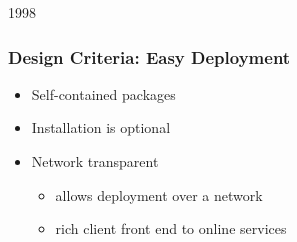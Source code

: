 
\begin{slide}{1998}\frametitle{Design Criteria: Easy Deployment}

\begin{itemize}
\item Self-contained packages
\item Installation is optional
\item Network transparent
  \begin{itemize}
  \item allows deployment over a network
  \item rich client front end to online services
  \end{itemize}
\end{itemize}

\end{slide}

